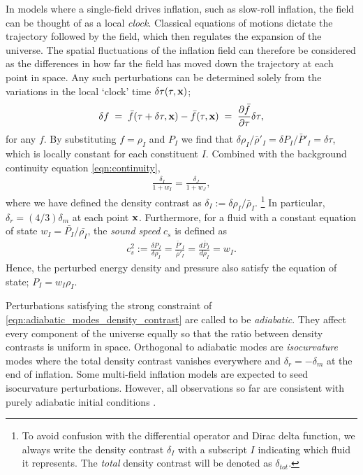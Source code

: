 In models where a single-field drives inflation, such as slow-roll inflation, the field can be thought of as a local \textit{clock}. Classical equations of motions dictate the trajectory followed by the field, which then regulates the expansion of the universe. The spatial fluctuations of the inflation field can therefore be considered as the differences in how far the field has moved down the trajectory at each point in space. Any such perturbations can be determined solely from the variations in the local `clock' time $\delta\tau(\tau,\mathbf{x})$;
\begin{align}
	\delta f \;=\; \bar{f}(\tau + \delta\tau, \mathbf{x}) - \bar{f}(\tau,\mathbf{x}) \;=\; \frac{\partial\bar{f}}{\partial\tau} \delta\tau, \label{eqn:local_clock_time_fluctuation}
\end{align}
for any $f$. By substituting $f=\rho_I$ and $P_I$ we find that $\delta\rho_I/\bar{\rho}'_I = \delta P_I / \bar{P}'_I = \delta\tau$, which is locally constant for each constituent $I$. Combined with the background continuity equation \eqref{eqn:continuity},
\begin{align}
	\frac{\delta_I}{1+w_I} = \frac{\delta_J}{1+w_J}, \label{eqn:adiabatic_modes_density_contrast}
\end{align}
where we have defined the density contrast as $\delta_I := \delta\rho_I / \bar{\rho}_I$. \footnote{To avoid confusion with the differential operator and Dirac delta function, we always write the density contrast $\delta_I$ with a subscript $I$ indicating which fluid it represents. The \textit{total} density contrast will be denoted as $\delta_{tot}$.} In particular, $\delta_r = (4/3) \delta_m$ at each point $\mathbf{x}$. Furthermore, for a fluid with a constant equation of state $w_I = \bar{P_I} / \bar{\rho_I}$, the \textit{sound speed} $c_s$ is defined as
\begin{align}
	c_s^2 := \frac{\delta P_I}{\delta\rho_I} = \frac{\bar{P}'_I}{\bar{\rho}'_I} = \frac{d\bar{P}_I}{d\bar{\rho}_I} = w_I. \label{eqn:adiabatic_modes_sound_speed}
\end{align}
Hence, the perturbed energy density and pressure also satisfy the equation of state; $P_I = w_I \rho_I$.

Perturbations satisfying the strong constraint of \eqref{eqn:adiabatic_modes_density_contrast} are called to be \textit{adiabatic}. They affect every component of the universe equally so that the ratio between density contrasts is uniform in space. Orthogonal to adiabatic modes are \textit{isocurvature} modes where the total density contrast vanishes everywhere and $\delta_r = -\delta_m$ at the end of inflation. Some multi-field inflation models are expected to seed isocurvature perturbations. However, all observations so far are consistent with purely adiabatic initial conditions \cite{Kogut2003wmapAdiabatic, PlanckCollaboration2018inflation}.

